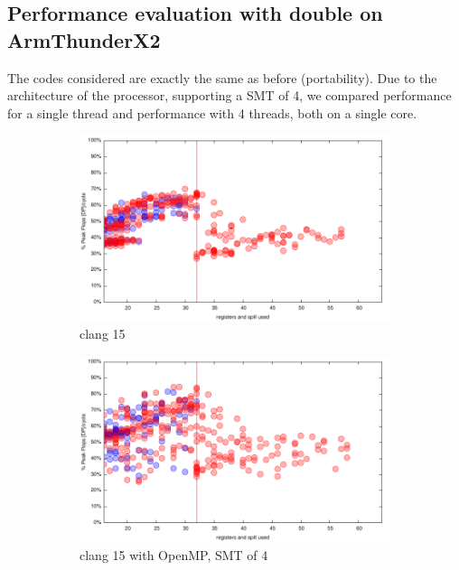 \documentclass[sigconf,review]{acmart}
\begin{document}
\subsection{Performance evaluation with double on ArmThunderX2}
The codes considered are exactly the same as before (portability).  Due to the architecture of the processor, supporting a SMT of 4, we compared performance for a single thread and performance with 4 threads, both on a single core. 

\begin{figure}[ht]
  \begin{subfigure}[h]{0.45\textwidth}
  \includegraphics[width=\textwidth]{../benches/gemm/arm-64x256x64/greedy.pdf}
  \caption{clang 15}
  \end{subfigure}
  \begin{subfigure}[h]{0.45\textwidth}  
\includegraphics[width=\textwidth]{../benches/gemm/arm-64x256x64/openmp.pdf}
  \caption{clang 15 with OpenMP, SMT of 4}
  \end{subfigure}
  \begin{subfigure}[h]{0.45\textwidth}  

\end{subfigure}
\end{figure}
\end{document}
